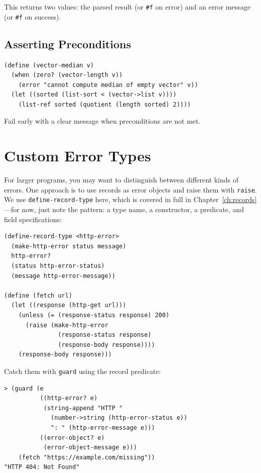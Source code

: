 This returns two values: the parsed result (or \texttt{\#f} on error) and an error message (or \texttt{\#f} on success).

\subsection{Asserting Preconditions}

\begin{lstlisting}
(define (vector-median v)
  (when (zero? (vector-length v))
    (error "cannot compute median of empty vector" v))
  (let ((sorted (list-sort < (vector->list v))))
    (list-ref sorted (quotient (length sorted) 2))))
\end{lstlisting}

Fail early with a clear message when preconditions are not met.

\section{Custom Error Types}

For larger programs, you may want to distinguish between different kinds of errors. One approach is to use records as error objects and raise them with \texttt{raise}. We use \texttt{define-record-type} here, which is covered in full in Chapter~\ref{ch:records}---for now, just note the pattern: a type name, a constructor, a predicate, and field specifications:

\begin{lstlisting}
(define-record-type <http-error>
  (make-http-error status message)
  http-error?
  (status http-error-status)
  (message http-error-message))

(define (fetch url)
  (let ((response (http-get url)))
    (unless (= (response-status response) 200)
      (raise (make-http-error
               (response-status response)
               (response-body response))))
    (response-body response)))
\end{lstlisting}

Catch them with \texttt{guard} using the record predicate:

\begin{lstlisting}[style=repl]
> (guard (e
          ((http-error? e)
           (string-append "HTTP "
             (number->string (http-error-status e))
             ": " (http-error-message e)))
          ((error-object? e)
           (error-object-message e)))
    (fetch "https://example.com/missing"))
"HTTP 404: Not Found"
\end{lstlisting}

